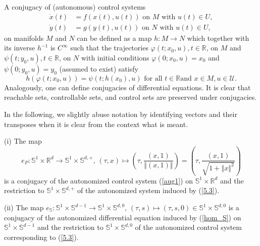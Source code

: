 \documentclass{siamltex}%
\begin{document}
A conjugacy of (autonomous) control systems%
\begin{align*}
\dot{x}(t)  &  =f(x(t),u(t))\text{ on }M\text{ with }u(t)\in U,\\
\dot{y}(t)  &  =g(y(t),u(t))\text{ on }N\text{ with }u(t)\in U,
\end{align*}
on manifolds $M$ and $N$ can be defined as a map $h:M\rightarrow N$ which
together with its inverse $h^{-1}$ is $C^{\infty}$ such that the trajectories
$\varphi(t;x_{0},u),t\in\mathbb{R}$, on $M$ and $\psi(t;y_{0},u),t\in
\mathbb{R}$, on $N$ with initial conditions $\varphi(0;x_{0},u)=x_{0}$ and
$\psi(0;y_{0},u)=y_{0}$ (assumed to exist) satisfy%
\[
h(\varphi(t;x_{0},u))=\psi(t;h(x_{0}),u)\text{ for all }t\in\mathbb{R}\text{
and }x\in M,u\in\mathcal{U}.
\]
Analogously, one can define conjugacies of differential equations. It is clear
that reachable sets, controllable sets, and control sets are preserved under conjugacies.

In the following, we slightly abuse notation by identifying vectors and their
transposes when it is clear from the context what is meant.

\begin{proposition}
\label{Proposition_e}(i) The map%
\[
e_{P}:\mathbb{S}^{1}\times\mathbb{R}^{d}\rightarrow\mathbb{S}^{1}%
\times\mathbb{S}^{d,+},\,(\tau,x)\mapsto\left(  \tau,\frac{(x,1)}{\left\Vert
(x,1)\right\Vert }\right)  =\left(  \tau,\frac{(x,1)}{\sqrt{1+\left\Vert
x\right\Vert ^{2}}}\right)
\]
is a conjugacy of the autonomized control system (\ref{aug1}) on
$\mathbb{S}^{1}\times\mathbb{R}^{d}$ and the restriction to $\mathbb{S}%
^{1}\times\mathbb{S}^{d,+}$ of the autonomized system induced by (\ref{5.3}).

(ii) The map $e_{\mathbb{S}}:\mathbb{S}^{1}\times\mathbb{S}^{d-1}%
\rightarrow\mathbb{S}^{1}\times\mathbb{S}^{d,0},\,(\tau,s)\mapsto(\tau
,s,0)\in\mathbb{S}^{1}\times\mathbb{S}^{d,0}$ is a conjugacy of the
autonomized differential equation induced by (\ref{hom_S}) on $\mathbb{S}%
^{1}\times\mathbb{S}^{d-1}$ and the restriction to $\mathbb{S}^{1}%
\times\mathbb{S}^{d,0}$ of the autonomized control system corresponding to
(\ref{5.3}).
\end{proposition}
\end{document}
